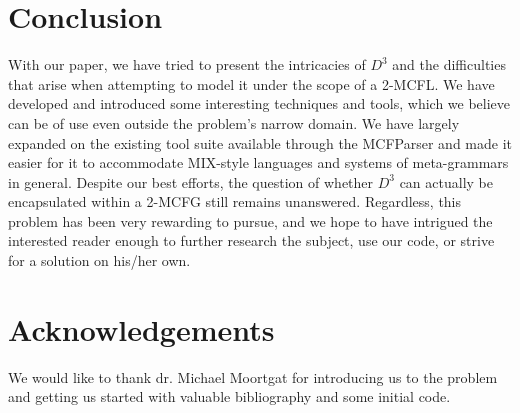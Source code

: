 \documentclass[nonatbib,numbers,10pt]{sigplanconf}
\begin{document}
\section{Conclusion}
With our paper, we have tried to present the intricacies of $D^3$ and the difficulties that arise when attempting to model it under the scope of a 2-MCFL. We have developed and introduced some interesting techniques and tools, which we believe can be of use even outside the problem's narrow domain. We have largely expanded on the existing tool suite available through the MCFParser and made it easier for it to accommodate MIX-style languages and systems of meta-grammars in general. Despite our best efforts, the question of whether $D^3$ can actually be encapsulated within a 2-MCFG still remains unanswered. Regardless, this problem has been very rewarding to pursue, and we hope to have intrigued the interested reader enough to further research the subject, use our code, or strive for a solution on his/her own.

\section*{Acknowledgements}
We would like to thank dr. Michael Moortgat for introducing us to the problem and getting us started with valuable bibliography and some initial code.




\end{document}
